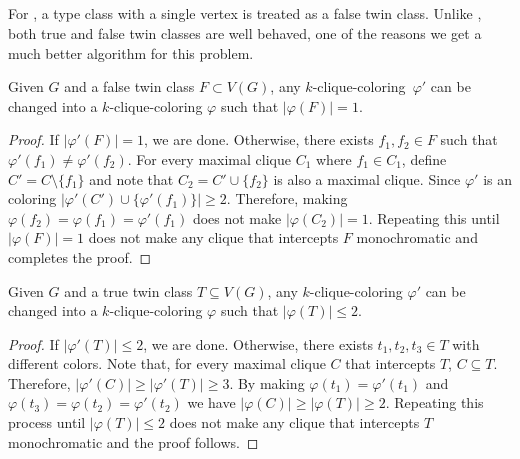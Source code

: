 \subsection{}

For , a type class with a single vertex is treated as a false twin class.
Unlike , both true and false twin classes are well behaved, one of the reasons we get a much better algorithm for this problem.


\begin{lemma}
    \label{lem:clique_false_twins}
    Given $G$ and a false twin class $F \subset V(G)$, any  $k$-clique-coloring~$\varphi'$ can be changed into a $k$-clique-coloring $\varphi$ such that $|\varphi(F)| = 1$.
\end{lemma}

\begin{proof}
    If $|\varphi'(F)| = 1$, we are done.
    Otherwise, there exists $f_1, f_2 \in F$ such that $\varphi'(f_1) \neq \varphi'(f_2)$.
    For every maximal clique $C_1$ where $f_1 \in C_1$, define $C' = C \setminus \{f_1\}$ and note that $C_2 = C' \cup \{f_2\}$ is also a maximal clique.
    Since $\varphi'$ is an  coloring $|\varphi'(C') \cup \{\varphi'(f_1)\}| \geq 2$.
    Therefore, making $\varphi(f_2) = \varphi(f_1) = \varphi'(f_1)$ does not make $|\varphi(C_2)| = 1$. 
    Repeating this until $|\varphi(F)| = 1$ does not make any clique that intercepts $F$ monochromatic and completes the proof.
\end{proof}
    
\begin{lemma}
    \label{lem:clique_true_twins}
    Given $G$ and  a true twin class $T \subseteq V(G)$, any  $k$-clique-coloring $\varphi'$ can be changed into a $k$-clique-coloring $\varphi$ such that $|\varphi(T)| \leq 2$.
\end{lemma}

\begin{proof}
    If $|\varphi'(T)| \leq 2$, we are done.
    Otherwise, there exists $t_1, t_2, t_3 \in T$ with different colors.
    Note that, for every maximal clique $C$ that intercepts $T$, $C \subseteq T$.
    Therefore, $|\varphi'(C)| \geq |\varphi'(T)| \geq 3$.
    By making $\varphi(t_1) = \varphi'(t_1)$ and $\varphi(t_3) = \varphi(t_2) = \varphi'(t_2)$ we have $|\varphi(C)| \geq |\varphi(T)| \geq 2$.
    Repeating this process until $|\varphi(T)| \leq 2$ does not make any clique that intercepts $T$ monochromatic and the proof follows.
\end{proof}

